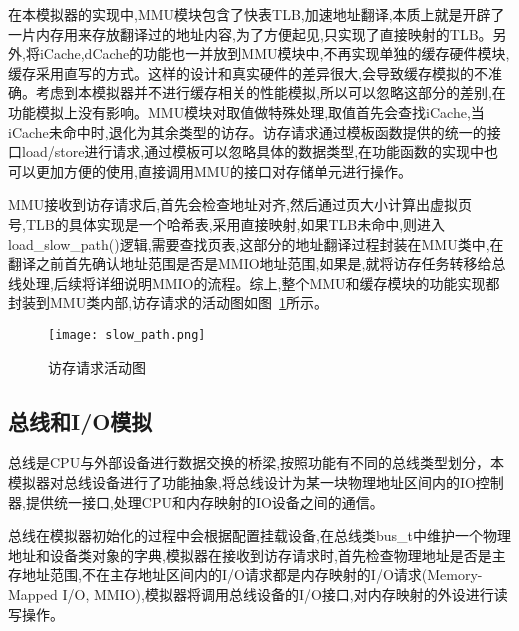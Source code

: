 在本模拟器的实现中,MMU模块包含了快表TLB,加速地址翻译,本质上就是开辟了一片内存用来存放翻译过的地址内容,为了方便起见,只实现了直接映射的TLB。另外,将iCache,dCache的功能也一并放到MMU模块中,不再实现单独的缓存硬件模块,缓存采用直写的方式。这样的设计和真实硬件的差异很大,会导致缓存模拟的不准确。考虑到本模拟器并不进行缓存相关的性能模拟,所以可以忽略这部分的差别,在功能模拟上没有影响。MMU模块对取值做特殊处理,取值首先会查找iCache,当iCache未命中时,退化为其余类型的访存。访存请求通过模板函数提供的统一的接口load/store进行请求,通过模板可以忽略具体的数据类型,在功能函数的实现中也可以更加方便的使用,直接调用MMU的接口对存储单元进行操作。


MMU接收到访存请求后,首先会检查地址对齐,然后通过页大小计算出虚拟页号,TLB的具体实现是一个哈希表,采用直接映射,如果TLB未命中,则进入load\_slow\_path()逻辑,需要查找页表,这部分的地址翻译过程封装在MMU类中,在翻译之前首先确认地址范围是否是MMIO地址范围,如果是,就将访存任务转移给总线处理,后续将详细说明MMIO的流程。综上,整个MMU和缓存模块的功能实现都封装到MMU类内部,访存请求的活动图如图~\ref{fig:slow_path}所示。
\begin{figure}[H]
    \centering
    \texttt{[image: slow\_path.png]}
    \caption{访存请求活动图}
    \label{fig:slow_path}
\end{figure}

\subsection{总线和I/O模拟}
总线是CPU与外部设备进行数据交换的桥梁,按照功能有不同的总线类型划分，本模拟器对总线设备进行了功能抽象,将总线设计为某一块物理地址区间内的IO控制器,提供统一接口,处理CPU和内存映射的IO设备之间的通信。


总线在模拟器初始化的过程中会根据配置挂载设备,在总线类bus\_t中维护一个物理地址和设备类对象的字典,模拟器在接收到访存请求时,首先检查物理地址是否是主存地址范围,不在主存地址区间内的I/O请求都是内存映射的I/O请求(Memory-Mapped I/O, MMIO),模拟器将调用总线设备的I/O接口,对内存映射的外设进行读写操作。

